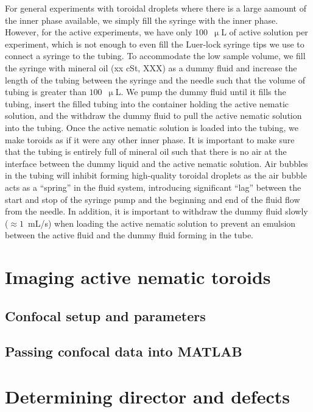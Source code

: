 For general experiments with toroidal droplets where there is a large aamount of the inner phase available, we simply fill the syringe with the inner phase.
However, for the active experiments, we have only 100~$\upmu$L of active solution per experiment, which is not enough to even fill the Luer-lock syringe tips we use to connect a syringe to the tubing.
To accommodate the low sample volume, we fill the syringe with mineral oil (xx cSt, XXX) as a dummy fluid and increase the length of the tubing between the syringe and the needle such that the volume of tubing is greater than $100$~$\upmu$L.
We pump the dummy fluid until it fills the tubing, insert the filled tubing into the container holding the active nematic solution, and the withdraw the dummy fluid to pull the active nematic solution into the tubing.
Once the active nematic solution is loaded into the tubing, we make toroids as if it were any other inner phase.
It is important to make sure that the tubing is entirely full of mineral oil such that there is no air at the interface between the dummy liquid and the active nematic solution.
Air bubbles in the tubing will inhibit forming high-quality toroidal droplets as the air bubble acts as a ``spring'' in the fluid system, introducing significant ``lag'' between the start and stop of the syringe pump and the beginning and end of the fluid flow from the needle.
In addition, it is important to withdraw the dummy fluid slowly ($\approx 1$~mL/s) when loading the active nematic solution to prevent an emulsion between the active fluid and the dummy fluid forming in the tube.\\




\section{Imaging active nematic toroids}
\subsection{Confocal setup and parameters}
\subsection{Passing confocal data into MATLAB}

\section{Determining director and defects}
